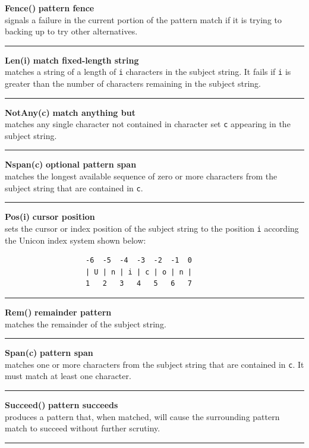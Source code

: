 \documentclass[letterpaper,12pt]{article}
\begin{document}
{\noindent\textbf{Fence()} \hfill\textbf{pattern fence}\\
signals a failure in the current portion of the pattern match
if it is trying to backing up to try other alternatives.\\
\noindent\rule{16.5cm}{0.1pt}

\noindent\textbf{Len(i)} \hfill\textbf{match fixed-length string}\\
matches a string of a length of \texttt{i} characters in the subject string.
It fails if \texttt{i} is greater than the number of characters remaining
in the subject string.\\
\noindent\rule{16.5cm}{0.1pt}

\noindent\textbf{NotAny(c)} \hfill\textbf{match anything but}\\
matches any single character not contained in character set \texttt{c}
appearing in the subject string.\\
\noindent\rule{16.5cm}{0.1pt}

\noindent\textbf{Nspan(c)} \hfill\textbf{optional pattern span}\\
matches the longest available sequence of zero or more characters
from the subject string that are contained in \texttt{c}.  \\
\noindent\rule{16.5cm}{0.1pt}

\noindent\textbf{Pos(i)} \hfill\textbf{cursor position}\\
sets the cursor or index position of the subject string to
the position \texttt{i} according the Unicon index system shown below:
\begin{verbatim}
                   -6  -5  -4  -3  -2  -1  0
                   | U | n | i | c | o | n |
                   1   2   3   4   5   6   7
\end{verbatim}
\noindent\rule{16.5cm}{0.1pt}

\noindent\textbf{Rem()} \hfill\textbf{remainder pattern}\\
matches the remainder of the subject string.\\
\noindent\rule{16.5cm}{0.1pt}

\noindent\textbf{Span(c)} \hfill\textbf{pattern span}\\
matches one or more characters from the subject string that
are contained in \texttt{c}.  It must match at least one character.\\
\noindent\rule{16.5cm}{0.1pt}

\noindent\textbf{Succeed()} \hfill\textbf{pattern succeeds}\\
produces a pattern that, when matched, will cause the surrounding
pattern match to succeed without further scrutiny.\\
\noindent\rule{16.5cm}{0.1pt}

}
\end{document}
